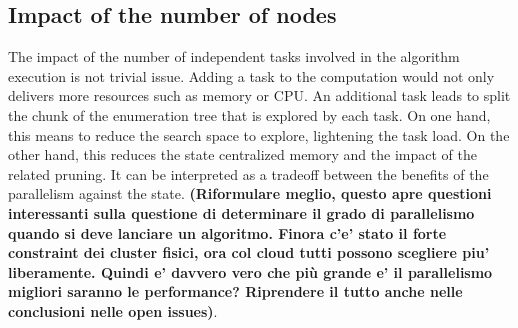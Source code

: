 %
%
%
%




\subsection{Impact of the number of nodes}\label{scalability}
The impact of the number of independent tasks involved in the algorithm execution is not trivial issue. Adding a task to the computation would not only delivers more resources such as memory or CPU. An additional task leads to split the chunk of the enumeration tree that is explored by each task. On one hand, this means to reduce the search space to explore, lightening the task load. On the other hand, this reduces the state centralized memory and the impact of the related pruning. It can be interpreted as a tradeoff between the benefits of the parallelism against the state. \textbf{(Riformulare meglio, questo apre questioni interessanti sulla questione di determinare il grado di parallelismo quando si deve lanciare un algoritmo. Finora c'e' stato il forte constraint dei cluster fisici, ora col cloud tutti possono scegliere piu' liberamente. Quindi e' davvero vero che più grande e' il parallelismo migliori saranno le performance? Riprendere il tutto anche nelle conclusioni nelle open issues)}.

